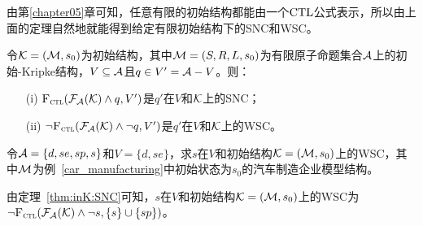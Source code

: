 由第\ref{chapter05}章可知，任意有限的初始结构都能由一个$\textrm{CTL}$公式表示，所以由上面的定理自然地就能得到给定有限初始结构下的SNC和WSC。
\begin{corollary}\label{thm:inK:SNC}
	令${\cal K}= ({\cal M}, s_0)$为初始结构，其中${\cal M}=(S,R,L,s_0)$为有限原子命题集合${\cal A}$上的初始-Kripke结构，$V \subseteq {\cal A}$且$q\in V' = {\cal A} - V$。则：
	\begin{itemize}
		\item[(i)] ${\textsc{F}_{\textsc{ctl}}}({\cal F}_{{\cal A}}({\cal K}) \wedge q, V')$是$q'$在$V$和${\cal K}$上的SNC；
		\item[(ii)] $\neg {\textsc{F}_{\textsc{ctl}}}({\cal F}_{{\cal A}}({\cal K}) \wedge \neg q, V')$是$q'$在$V$和${\cal K}$上的WSC。
	\end{itemize}
\end{corollary}

\begin{example}
	\label{exam:SNCandWSC}
令${\cal A}=\{d,se,sp,s\}$和$V=\{d,se\}$，求$s$在$V$和初始结构${\cal K} = ({\cal M},s_0)$上的WSC，其中${\cal M}$为例~\ref{car_manufacturing}中初始状态为$s_0$的汽车制造企业模型结构。

由定理~\ref{thm:inK:SNC}可知，$s$在$V$和初始结构${\cal K} = ({\cal M},s_0)$上的WSC为$\neg {\textsc{F}_{\textsc{ctl}}}({\cal F}_{{\cal A}}({\cal K}) \wedge \neg s, \{s\} \cup \{sp\})$。


\end{example}
